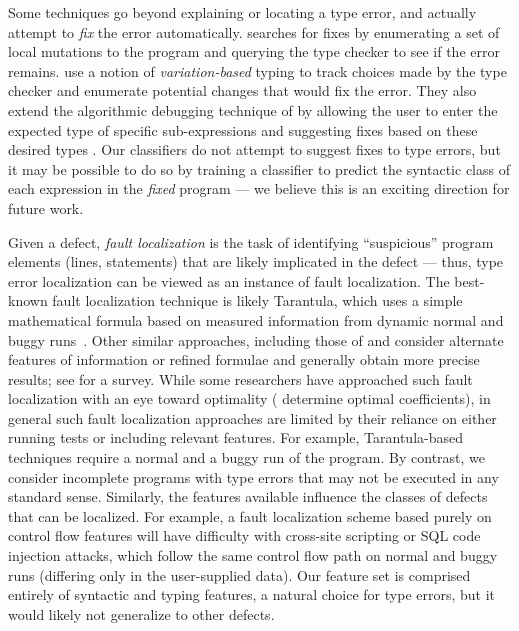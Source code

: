 Some techniques go beyond explaining or locating a type error,
and actually attempt to \emph{fix} the error automatically.
%
\citet{Lerner2007-dt} searches for fixes by enumerating a
set of local mutations to the program and querying the type checker to
see if the error remains.
%
\citet{Chen2014-gd} use a notion of \emph{variation-based} typing to
track choices made by the type checker and enumerate potential
changes that would fix the error.
%
They also extend the algorithmic debugging technique of
\citeauthor{Chitil2001-td} by allowing the user to enter the expected
type of specific sub-expressions and suggesting fixes based on these
desired types \citeyear{Chen2014-vm}.
%
Our classifiers do not attempt to suggest fixes to type errors, but it
may be possible to do so by training a classifier to predict the
syntactic class of each expression in the \emph{fixed} program --- we
believe this is an exciting direction for future work.

%
Given a defect, \emph{fault localization} is the task of identifying
``suspicious'' program elements (\eg lines, statements) that are likely
implicated in the defect %
%
--- thus, type error localization can be viewed as an instance of fault
localization.
%
The best-known fault localization technique is likely Tarantula, which
uses a simple mathematical formula based on measured information from
dynamic normal and buggy runs~\citep{Jones2002-us}.
%
Other similar approaches, including those of \citet{Chen2002-qz} and
\citet{Abreu2006-fn,Abreu2007-mu} consider alternate features of
information or refined formulae and generally obtain more precise
results; see \citet{Wong2009-pd} for a survey.
%
While some researchers have approached such fault localization with an
eye toward optimality (\eg \citet{Yoo2013-rw} determine optimal
coefficients), in general such fault localization approaches are limited
by their reliance on either running tests or including relevant
features.
%
For example, Tarantula-based techniques require a normal and a buggy run
of the program.
%
By contrast, we consider incomplete programs with type errors that may
not be executed in any standard sense.
%
Similarly, the features available influence the classes of defects that
can be localized.
%
For example, a fault localization scheme based purely on control flow features
will have difficulty with cross-site scripting or SQL code injection
attacks, which follow the same control flow path on normal and buggy
runs (differing only in the user-supplied data).
%
Our feature set is comprised entirely of syntactic and typing features,
a natural choice for type errors, but it would likely not
generalize to other defects.





